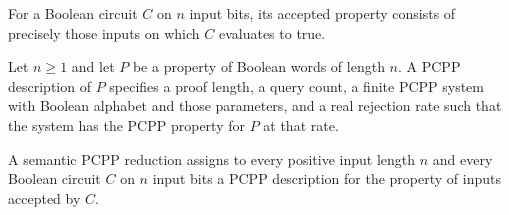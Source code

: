 \begin{definition}
\label{FABL.BooleanCircuit.acceptedProperty}
\leanok
{}
For a Boolean circuit $C$ on $n$ input bits, its accepted property consists of precisely
those inputs on which $C$ evaluates to true.
\end{definition}

\begin{definition}
\label{FABL.PCPPDescription}
\leanok
{}
Let $n\ge1$ and let $P$ be a property of Boolean words of length $n$. A PCPP description
of $P$ specifies a proof length, a query count, a finite PCPP system with Boolean
alphabet and those parameters, and a real rejection rate such that the system has the
PCPP property for $P$ at that rate.
\end{definition}

\begin{definition}
\label{FABL.SemanticPCPPReduction}
\leanok
{}
A semantic PCPP reduction assigns to every positive input length $n$ and every Boolean
circuit $C$ on $n$ input bits a PCPP description for the property of inputs accepted by
$C$.
\end{definition}
